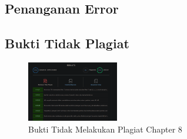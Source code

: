 \subsection{Penanganan Error}

\subsection{Bukti Tidak Plagiat}
\begin{figure}[H]
    \includegraphics[width=4cm]{figures/1174074/8/8.png}
    \centering
    \caption{Bukti Tidak Melakukan Plagiat Chapter 8}
\end{figure}